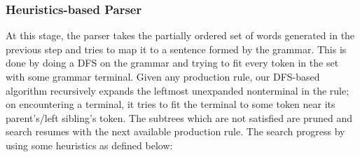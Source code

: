 \def\DevnagVersion{2.15}\documentclass[12pt]{article}
\begin{document}
\subsubsection{Heuristics-based Parser}
At this stage, the parser takes the partially ordered set of words generated in the previous step and tries to map it to a sentence formed by the grammar. This is done by doing a DFS on the grammar and trying to fit every token in the set with some grammar terminal. Given any production rule, our DFS-based algorithm recursively expands the leftmost unexpanded nonterminal in the rule; on encountering a terminal, it tries to fit the terminal to some token near its parent's/left sibling's token. The subtrees which are not satisfied are pruned and search resumes with the next available production rule. The search progress by using some heuristics as defined below:
\end{document}
